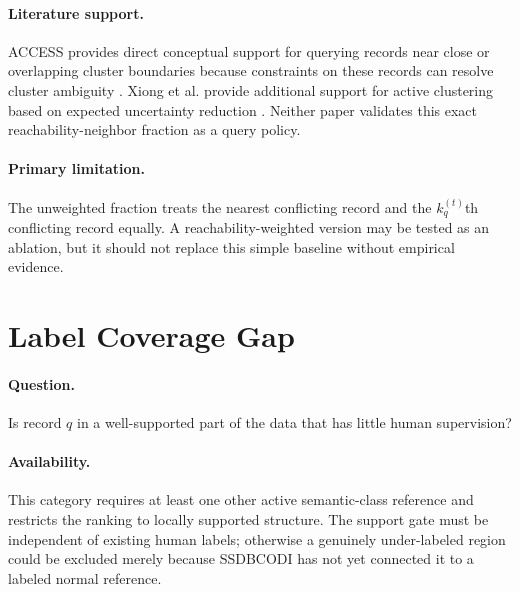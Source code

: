 \documentclass[11pt]{article}
\begin{document}
\paragraph{Literature support.}
ACCESS provides direct conceptual support for querying records near close or
overlapping cluster boundaries because constraints on these records can resolve
cluster ambiguity \cite{xu2005access}. Xiong et al. provide additional support
for active clustering based on expected uncertainty reduction
\cite{xiong2017active}. Neither paper validates this exact reachability-neighbor
fraction as a query policy.

\paragraph{Primary limitation.}
The unweighted fraction treats the nearest conflicting record and the
$k_q^{(t)}$th conflicting record equally. A reachability-weighted version may
be tested as an ablation, but it should not replace this simple baseline without
empirical evidence.

\section{Label Coverage Gap}

\paragraph{Question.}
Is record $q$ in a well-supported part of the data that has little human
supervision?

\paragraph{Availability.}
This category requires at least one other active semantic-class reference and
restricts the ranking to locally supported structure. The support gate must be independent
of existing human labels; otherwise a genuinely under-labeled region could be
excluded merely because SSDBCODI has not yet connected it to a labeled normal
reference.
\end{document}
